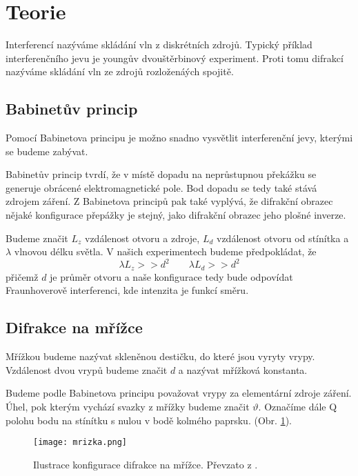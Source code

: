 \section{Teorie} %
\label{sec:teorie}
	Interferencí nazýváme skládání vln z diskrétních zdrojů. Typický příklad interferenčního jevu je youngův dvouštěrbinový experiment. Proti tomu difrakcí nazýváme skládání vln ze zdrojů rozloženáých spojitě.

	\subsection{Babinetův princip} %
	\label{sub:babinetův_princip}
		Pomocí Babinetova principu je možno snadno vysvětlit interferenční jevy, kterými se budeme zabývat.

		Babinetův princip tvrdí, že v místě dopadu na neprůstupnou překážku se generuje obrácené elektromagnetické pole. Bod dopadu se tedy také stává zdrojem záření. Z Babinetova principů pak také vyplývá, že difrakční obrazec nějaké konfigurace přepážky je stejný, jako difrakční obrazec jeho plošné inverze.	

	Budeme značit $L_z$ vzdálenost otvoru a zdroje, $L_d$ vzdálenost otvoru od stínítka a $\lambda$ vlnovou délku světla. V našich experimentech budeme předpokládat, že
	\begin{equation}
		\lambda L_z >> d^2 \qquad \lambda L_d >> d^2
	\end{equation}
	přičemž $d$ je průměr otvoru a naše konfigurace tedy bude odpovídat Fraunhoverově interferenci, kde intenzita je funkcí směru.
	\subsection{Difrakce na mřížce} %
	\label{sub:difrakce_na_mřížce}
		Mřížkou budeme nazývat skleněnou destičku, do které jsou vyryty vrypy. Vzdálenost dvou vrypů budeme značit $d$ a nazývat mřížková konstanta.

		Budeme podle Babinetova principu považovat vrypy za elementární zdroje záření. Úhel, pok kterým vychází svazky z mřížky budeme značit $\vartheta$. Označíme dále Q polohu bodu na stínítku s nulou v bodě kolmého paprsku. (Obr. \ref{fig:mrizka}).
		\begin{figure}[!ht]
			\begin{center}
				\texttt{[image: mrizka.png]}
			\end{center}
			\caption{Ilustrace konfigurace difrakce na mřížce. Převzato z \cite{navod}.}
			\label{fig:mrizka}
		\end{figure}

